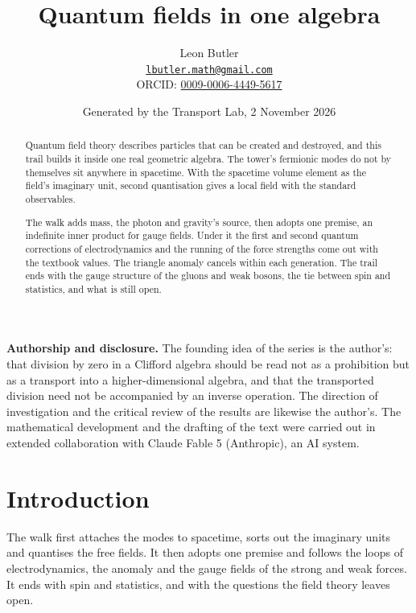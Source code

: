 \documentclass[11pt]{article}
\title{\bfseries Quantum fields in one algebra}
\author{Leon Butler\\ \normalsize\href{mailto:lbutler.math@gmail.com}{\texttt{lbutler.math@gmail.com}}\\ \normalsize ORCID: \href{https://orcid.org/0009-0006-4449-5617}{0009-0006-4449-5617}}
\date{Generated by the Transport Lab, 2 November 2026}
\theoremstyle{definition}
\theoremstyle{plain}
\begin{document}
\maketitle
\begin{abstract}
\normalsize
Quantum field theory describes particles that can be created and destroyed, and this trail builds it inside one real geometric algebra. The tower's fermionic modes do not by themselves sit anywhere in spacetime. With the spacetime volume element as the field's imaginary unit, second quantisation gives a local field with the standard observables.

The walk adds mass, the photon and gravity's source, then adopts one premise, an indefinite inner product for gauge fields. Under it the first and second quantum corrections of electrodynamics and the running of the force strengths come out with the textbook values. The triangle anomaly cancels within each generation. The trail ends with the gauge structure of the gluons and weak bosons, the tie between spin and statistics, and what is still open.
\end{abstract}
\newpage
\noindent \textbf{Authorship and disclosure. }The founding idea of the series is the author's: that division by zero in a Clifford algebra should be read not as a prohibition but as a transport into a higher-dimensional algebra, and that the transported division need not be accompanied by an inverse operation. The direction of investigation and the critical review of the results are likewise the author's. The mathematical development and the drafting of the text were carried out in extended collaboration with Claude Fable 5 (Anthropic), an AI system.

\noindent{}
\newpage

\section*{Introduction}
The walk first attaches the modes to spacetime, sorts out the imaginary units and quantises the free fields. It then adopts one premise and follows the loops of electrodynamics, the anomaly and the gauge fields of the strong and weak forces. It ends with spin and statistics, and with the questions the field theory leaves open.
\end{document}
